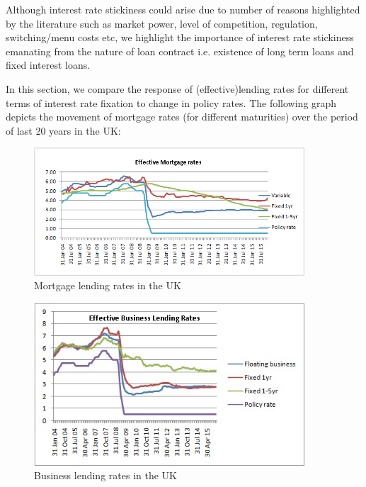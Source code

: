 \documentclass[12pt]{article}
\numberwithin{equation}{section}
\begin{document}
Although interest rate stickiness could arise due to number of reasons highlighted by the literature such as market power, level of competition, regulation, switching/menu costs etc, we highlight the importance of interest rate stickiness emanating from the nature of loan contract i.e. existence of long term loans and fixed interest loans.


In this section, we compare the response of (effective)lending rates for different terms of interest rate fixation to change in policy rates. The following graph depicts the movement of mortgage rates (for different maturities) over the period of last 20 years in the UK:
\begin{figure}[h!] 
	\caption{Mortgage lending rates in the UK} 
	\centering
	
	\includegraphics[width=0.9\textwidth]{mortgage}
	
\end{figure}

\begin{figure}[h!] 
	\caption{Business lending rates in the UK} 
	\includegraphics[width=0.9\textwidth]{busirate}
	
\end{figure}
\end{document}
